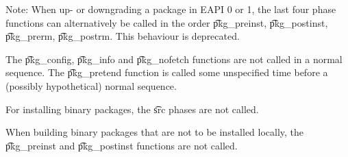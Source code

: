 Note: When up- or downgrading a package in EAPI 0 or 1, the last four phase functions can
alternatively be called in the order \t{pkg\_preinst}, \t{pkg\_postinst}, \t{pkg\_prerm},
\t{pkg\_postrm}. This behaviour is deprecated.

The \t{pkg\_config}, \t{pkg\_info} and \t{pkg\_nofetch} functions are not called in a normal
sequence. The \t{pkg\_pretend} function is called some unspecified time before a (possibly
hypothetical) normal sequence.

For installing binary packages, the \t{src} phases are not called.

When building binary packages that are not to be installed locally, the \t{pkg\_preinst}
and \t{pkg\_postinst} functions are not called.


